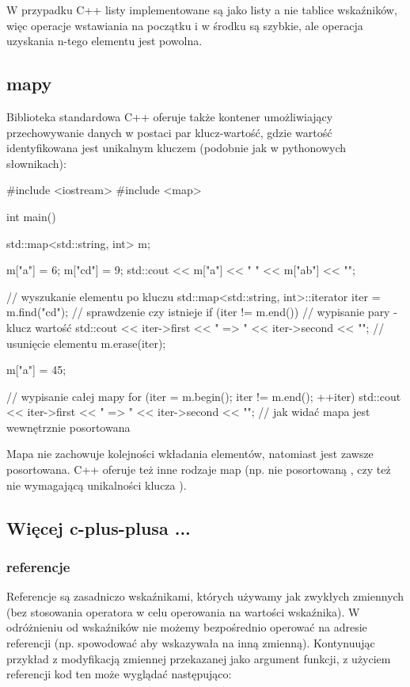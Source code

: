 \documentclass{pdfBooklets}
\begin{document}
W przypadku C++ listy implementowane są jako listy a nie tablice wskaźników, więc operacje wstawiania na początku i w środku są szybkie, ale operacja uzyskania n-tego elementu jest powolna.

\subsection{mapy}

Biblioteka standardowa C++ oferuje także kontener umożliwiający przechowywanie danych w postaci par klucz-wartość, gdzie wartość identyfikowana jest unikalnym kluczem (podobnie jak w pythonowych słownikach):

\begin{CodeFrame*}[cpp]{}
#include <iostream>
#include <map>

int main() {
    std::map<std::string, int> m;
    
    m["a"] = 6;
    m["cd"] = 9;
    std::cout << m["a"] << " " << m["ab"] << "\n";
    
    // wyszukanie elementu po kluczu
    std::map<std::string, int>::iterator iter = m.find("cd");
    // sprawdzenie czy istnieje
    if (iter != m.end()) {
        // wypisanie pary - klucz wartość
        std::cout << iter->first << " => " << iter->second << "\n";
        // usunięcie elementu
        m.erase(iter);
    }
    
    m["a"] = 45;
    
    // wypisanie całej mapy
    for (iter = m.begin(); iter != m.end(); ++iter)
        std::cout << iter->first << " => " << iter->second << "\n";
    // jak widać mapa jest wewnętrznie posortowana
}
\end{CodeFrame*}

Mapa  nie zachowuje kolejności wkładania elementów, natomiast jest zawsze posortowana.
C++ oferuje też inne rodzaje map (np. nie posortowaną , czy też nie wymagającą unikalności klucza ).


\subsection{Więcej c-plus-plusa ...}

\subsubsection{referencje}

Referencje są zasadniczo wskaźnikami, których używamy jak zwykłych zmiennych (bez stosowania operatora \cpp{*} w celu operowania na wartości wskaźnika).
W odróżnieniu od wskaźników nie możemy bezpośrednio operować na adresie referencji (np. spowodować aby wskazywała na inną zmienną).
Kontynuując przykład z modyfikacją zmiennej przekazanej jako argument funkcji, z użyciem referencji kod ten może wyglądać następująco:
\end{document}
